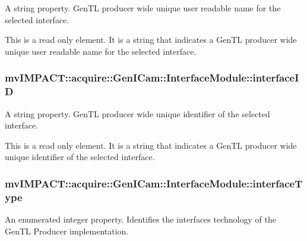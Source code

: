 A string property. Gen\+T\+L producer wide unique user readable name for the selected interface. 

This is a read only element. It is a string that indicates a Gen\+T\+L producer wide unique user readable name for the selected interface. \hypertarget{classmv_i_m_p_a_c_t_1_1acquire_1_1_gen_i_cam_1_1_interface_module_a652ecc53eafb859fb73d7a16fe99cbb6}{
\subsubsection[{interface\+I\+D}]{ mv\+I\+M\+P\+A\+C\+T\+::acquire\+::\+Gen\+I\+Cam\+::\+Interface\+Module\+::interface\+I\+D}}\label{classmv_i_m_p_a_c_t_1_1acquire_1_1_gen_i_cam_1_1_interface_module_a652ecc53eafb859fb73d7a16fe99cbb6}


A string property. Gen\+T\+L producer wide unique identifier of the selected interface. 

This is a read only element. It is a string that indicates a Gen\+T\+L producer wide unique identifier of the selected interface. \hypertarget{classmv_i_m_p_a_c_t_1_1acquire_1_1_gen_i_cam_1_1_interface_module_ab3a56f3f46e153929e7cf2bb8ab09cac}{
\subsubsection[{interface\+Type}]{ mv\+I\+M\+P\+A\+C\+T\+::acquire\+::\+Gen\+I\+Cam\+::\+Interface\+Module\+::interface\+Type}}\label{classmv_i_m_p_a_c_t_1_1acquire_1_1_gen_i_cam_1_1_interface_module_ab3a56f3f46e153929e7cf2bb8ab09cac}


An enumerated integer property. Identifies the interfaces technology of the Gen\+T\+L Producer implementation. 

